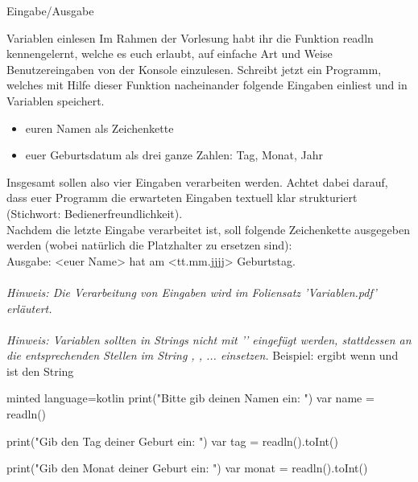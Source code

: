 \begin{task}[points=auto]{Eingabe/Ausgabe }
    \begin{subtask*}[points=0]{Variablen einlesen}
        Im Rahmen der Vorlesung habt ihr die Funktion {\ttfamily readln} kennengelernt, welche es euch erlaubt, auf einfache Art und Weise Benutzereingaben von der Konsole einzulesen. Schreibt jetzt ein Programm, welches mit Hilfe dieser Funktion nacheinander folgende Eingaben einliest und in Variablen speichert.
        \begin{itemize}
            \item euren Namen als Zeichenkette
            \item euer Geburtsdatum als drei ganze Zahlen: Tag, Monat, Jahr
        \end{itemize}
        Insgesamt sollen also vier Eingaben verarbeiten werden. Achtet dabei darauf, dass euer Programm die erwarteten Eingaben textuell klar strukturiert (Stichwort: Bedienerfreundlichkeit).\\
        Nachdem die letzte Eingabe verarbeitet ist, soll folgende Zeichenkette ausgegeben werden (wobei natürlich die Platzhalter zu ersetzen sind):\\
        Ausgabe: {\ttfamily{\dq}}<euer Name> hat am <tt.mm.jjjj> Geburtstag.{\ttfamily{\dq}}\\
        \\
        \textit{Hinweis: Die Verarbeitung von Eingaben wird im Foliensatz 'Variablen.pdf' erläutert.}\\
        \\
        \textit{Hinweis: Variablen sollten in Strings nicht mit '\kotlininline{+}' eingefügt werden, stattdessen an die entsprechenden Stellen im String , , ... einsetzen.}
        Beispiel:  ergibt wenn  und  ist den String 

        \begin{solution}
            \begin{codeBlock}[]{minted language=kotlin}
                print("Bitte gib deinen Namen ein: ")
                var name = readln()

                print("Gib den Tag deiner Geburt ein: ")
                var tag = readln().toInt()

                print("Gib den Monat deiner Geburt ein: ")
                var monat = readln().toInt()


\end{codeBlock}
\end{solution}
\end{subtask*}
\end{task}
